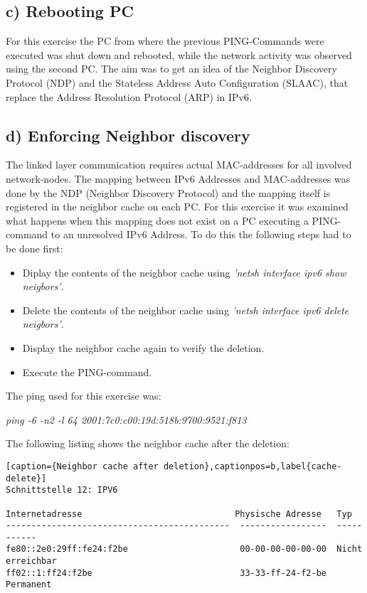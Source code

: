 \subsection{c) Rebooting PC}
For this exercise the PC from where the previous PING-Commands were executed was shut down and rebooted, while the network activity was observed using the second PC. The aim was to get an idea of the Neighbor Discovery Protocol (NDP) and the Stateless Address Auto Configuration (SLAAC), that replace the Address Resolution Protocol (ARP) in IPv6.
\subsection{d) Enforcing Neighbor discovery}
The linked layer communication requires actual MAC-addresses for all involved network-nodes. The mapping between IPv6 Addresses and MAC-addresses was done by the NDP (Neighbor Discovery Protocol) and the mapping itself is registered in the neighbor cache on each PC. For this exercise it was examined what happens when this mapping does not exist on a PC executing a PING-command to an unresolved IPv6 Address. To do this the following steps had to be done first:
\begin{itemize}
	\item Diplay the contents of the neighbor cache using \textit{'netsh interface ipv6 show neigbors'}.
	\item Delete the contents of the neighbor cache using \textit{'netsh interface ipv6 delete neigbors'}.
	\item Display the neighbor cache again to verify the deletion.
	\item Execute the PING-command.
\end{itemize}
The ping used for this exercise was:
\begin{center}
	\textit{ping -6 -n2 -l 64 2001:7c0:c00:19d:518b:9700:9521:f813}
\end{center}
The following listing shows the neighbor cache after the deletion:
\begin{lstlisting}[caption={Neighbor cache after deletion},captionpos=b,label{cache-delete}]
Schnittstelle 12: IPV6

Internetadresse                              Physische Adresse   Typ
--------------------------------------------  -----------------  -----------
fe80::2e0:29ff:fe24:f2be                      00-00-00-00-00-00  Nicht erreichbar
ff02::1:ff24:f2be                             33-33-ff-24-f2-be  Permanent
\end{lstlisting}

